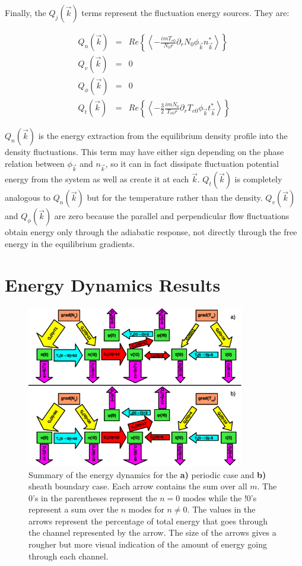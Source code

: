 \documentclass[showpacs,preprintnumbers,amsmath,amssymb,superscriptaddress,aip]{revtex4-1}
\def\beqar{\begin{eqnarray}}
\def\eeqar{\end{eqnarray}}
\newcommand{\pdr}{\partial_r}
\begin{document}
Finally, the $Q_j(\vec{k})$ terms represent the fluctuation energy sources. They are:

\beqar
Q_n(\vec{k}) & = & Re \left\{ \left< -\frac{i m T_{e0}}{N_0 r} \pdr N_0 \phi_{\vec{k}} n_{\vec{k}}^*  \right> \right\}
\label{Qnk} \\
Q_v(\vec{k}) & = & 0
\label{Qvk} \\
Q_\phi(\vec{k}) & = & 0
\label{Qpk} \\
Q_t(\vec{k}) & = & Re \left\{ \left< -\frac{3}{2} \frac{i m N_0}{T_{e0} r} \pdr T_{e0} \phi_{\vec{k}} t_{\vec{k}}^*  \right> \right\}
\label{Qtk}
\eeqar

$Q_n(\vec{k})$ is the energy extraction from the equilibrium density profile into the density fluctuations. 
This term may have either sign depending on the phase relation between $\phi_{\vec{k}}$ and $n_{\vec{k}}$, 
so it can in fact dissipate fluctuation potential energy from the system as well as create it
at each $\vec{k}$. $Q_t(\vec{k})$ is completely analogous to $Q_n(\vec{k})$ but for the temperature rather than the density. 
$Q_v(\vec{k})$ and $Q_\phi(\vec{k})$ are zero because the parallel and perpendicular flow fluctuations obtain energy only through the adiabatic response, not directly through the free
energy in the equilibrium gradients.


\section{Energy Dynamics Results}
\label{dyn_results}

\begin{figure}[!htbp]
\includegraphics[width=0.85\textwidth]{energy_diagrams}
\hfil
\caption{Summary of the energy dynamics for the \textbf{a)} periodic case and \textbf{b)} sheath boundary case. Each arrow contains the sum over all $m$. The 0's in the parentheses
represent the $n=0$ modes while the !0's represent a sum over the $n$ modes for $n \ne 0$. The values in the arrows represent the percentage of total energy that goes through the channel
represented by the arrow. The size of the arrows gives a rougher but more visual indication of the amount of energy going through each channel.}
\label{en_diagrams}
\end{figure}
\end{document}
